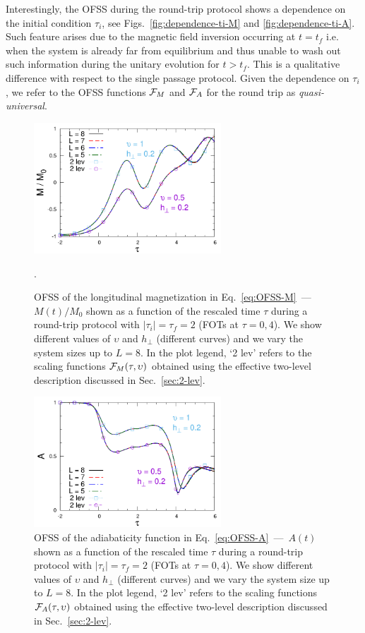 Interestingly, the OFSS during the round-trip protocol shows a dependence on the initial condition $\tau_i$, see Figs.~\ref{fig:dependence-ti-M} and \ref{fig:dependence-ti-A}. Such feature arises due to the magnetic field inversion occurring at $t=t_f$ i.e. when the system is already far from equilibrium and thus unable to wash out such information during the unitary evolution for $t>t_f$. This is a qualitative difference with respect to the single passage protocol. Given the dependence on $\tau_i$, we refer to the OFSS functions ${\cal F}_M$ and ${\cal F}_A$  for the round trip as {\it quasi-universal}.\\
\begin{figure}[t]
\centering
\includegraphics[width=7cm]{imm/tripMt2u05g02-new.pdf}
\caption{OFSS of the longitudinal magnetization in Eq.~\eqref{eq:OFSS-M}~---~$M(t)/M_0$ shown as a function of the rescaled time $\tau$ during a round-trip protocol with $|\tau _i|=\tau_f= 2$ (FOTs at $\tau=0,4$). We show different values of $\upsilon$ and $h_\perp$ (different curves) and we vary the system sizes up to $L = 8$. In the plot legend, `2 lev' refers to the scaling functions ${\cal F}_M(\tau,\upsilon)$ obtained using the effective two-level description discussed in Sec.~\ref{sec:2-lev}.}.
\label{LongMagn}
\end{figure}
	\begin{figure}[t]
\centering
		\includegraphics[width=7cm]{imm/tripAt2u05g02-new.pdf}
		\caption{OFSS  of the adiabaticity function in Eq.~\eqref{eq:OFSS-A}~---~$A(t)$ shown as a function of the rescaled time $\tau$ during a round-trip protocol with $|\tau_i|=\tau_f =2$ (FOTs at $\tau=0,4$). We show different values of $\upsilon $ and $h_\perp$ (different curves) and we vary the system size up to $L = 8$.  In the plot legend, `2 lev' refers to the scaling functions ${\cal F}_A(\tau,\upsilon)$ obtained using the effective two-level description discussed in Sec.~\ref{sec:2-lev}.}
		\label{AtripAt2u05g02}
	\end{figure}	
